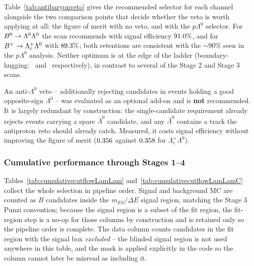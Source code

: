 

Table~\ref{tab:antibaryonveto} gives the recommended selector for each
channel alongside the two comparison points that decide whether the veto is
worth applying at all: the figure of merit with no veto, and with the
$p\Lambda^0$ selector. For $B^0 \rightarrow \Lambda^0\Lambda^0$ the scan
recommends \texttt{\LamLamVetoSelector} with signal efficiency
$91.0\%$, and for $B^+ \rightarrow
\Lambda_c^+\Lambda^0$ \texttt{\LamLamCVetoSelector} with
$89.3\%$; both retentions are consistent with the ${\sim}90\%$
seen in the $p\Lambda^0$ analysis. Neither optimum is at the edge of the
ladder (boundary-hugging: \LamLamVetoAtBoundary\ and
\LamLamCVetoAtBoundary\ respectively), in contrast to several of the Stage 2
and Stage 3 scans.

An anti-$\Lambda^0$ veto -- additionally rejecting candidates in events
holding a good opposite-sign $\Lambda^0$ -- was evaluated as an optional
add-on and is \textbf{not} recommended. It is largely redundant by
construction: the single-candidate requirement already rejects events
carrying a spare $\bar\Lambda^0$ candidate, and any $\bar\Lambda^0$ contains
a track the antiproton veto should already catch. Measured, it costs signal
efficiency without improving the figure of merit
($0.356$ against $0.358$ for
$\Lambda_c^+\Lambda^0$).

\subsubsection{Cumulative performance through Stages 1--4}




Tables~\ref{tab:cumulativecutflowLamLam}
and~\ref{tab:cumulativecutflowLamLamC} collect the whole selection in
pipeline order. Signal and background MC are counted as $B$ candidates
inside the $m_{ES}/\Delta E$ signal region, matching the Stage 3 Punzi
convention; because the signal region is a subset of the fit region, the
fit-region step is a no-op for those columns by construction and is retained
only so the pipeline order is complete. The data column counts candidates in
the fit region with the signal box \emph{excluded} -- the blinded signal
region is not used anywhere in this table, and the mask is applied
explicitly in the code so the column cannot later be misread as including
it.


